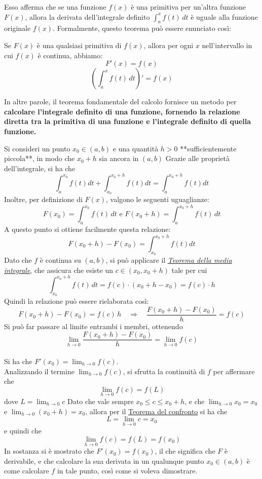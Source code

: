 \documentclass{article}
\begin{document}
Esso afferma che se una funzione $f(x)$ è una primitiva per un'altra funzione
$F(x)$, allora la derivata dell'integrale definito $\int_a^x f(t) \, dt$ è
uguale alla funzione originale $f(x)$. Formalmente, questo teorema può essere
enunciato così:

Se $F(x)$ è una qualsiasi primitiva di $f(x)$, allora per ogni $x$
nell'intervallo in cui $f(x)$ è continua, abbiamo: $$ F'(x) = f(x) $$ $$ \left(
    \int_a^x f(t) \, dt \right)' = f(x) $$

In altre parole, il teorema fondamentale del calcolo fornisce un metodo per
\textbf{calcolare l'integrale definito di una funzione, fornendo la relazione
    diretta tra la primitiva di una funzione e l'integrale definito di quella
    funzione.}

Si consideri un punto $x_0 \in (a,b)$ e una quantità $h > 0$ **sufficientemente
piccola**, in modo che $x_0 + h$ sia ancora in $(a,b)$ Grazie alle proprietà
dell'integrale, si ha che $$\int_a^{x_0} f(t)dt + \int_{x_0}^{x_0+h} f(t)dt =
    \int_a^{x_0+h}f(t)dt$$ Inoltre, per definizione di $F(x)$, valgono le seguenti
uguaglianze:$$F(x_0) = \int_a^{x_0} f(t) \, dt \text{ e } F(x_0 + h) =
    \int_a^{x_0+h}f(t) \, dt$$ A questo punto si ottiene facilmente questa
relazione: $$F(x_0+h) - F(x_0) = \int_{x_0}^{x_0 + h}f(t)dt$$ Dato che $f$ è
continua su $(a,b)$, si può applicare il \textit{\underline{Teorema della media
        integrale}}, che assicura che esiste un $c \in (x_0, x_0 + h)$ tale per cui
$$\int_{x_0}^{x_0 + h}f(t) \, dt = f(c) \cdot (x_0 +h - x_0) = f(c) \cdot
    h$$Quindi la relazione può essere rielaborata così: $$F(x_0+h) - F(x_0) = f(c)
    \, h \quad \Rightarrow \quad \frac{F(x_0+h) - F(x_0)}{h} = f(c)$$ Si può far
passare al limite entrambi i membri, ottenendo$$\lim_{h \to 0} \frac{F(x_0+h) -
        F(x_0)}{h} = \lim_{h \to 0}f(c)$$\\ Si ha che $F'(x_0) = \lim_{h \to
        0}f(c)$.\\Analizzando il termine $\lim_{h \to 0}f(c)$, si sfrutta la continuità
di $f$ per affermare che $$\lim_{h \to 0}f(c) = f(L)$$ dove $L = \lim_{h \to
        0}c$ Dato che vale sempre $x_0 \leq c \leq x_0 + h$, e che $\lim_{h \to 0}x_0 =
    x_0$ e $\lim_{h \to 0} ( x_0 + h )= x_0$, allora per il \underline{Teorema del
    confronto} si ha che \[L = \lim_{h \to 0}c = x_0\] e quindi che \[\lim_{h \to 0}f(c) = f(L) = f(x_0)\]
In sostanza si è mostrato che $F'(x_0) = f(x_0)$, il che significa che $F$ è
derivabile, e che calcolare la sua derivata in un qualunque punto $x_0 \in
    (a,b)$ è come calcolare $f$ in tale punto, così come si voleva dimostrare.
\end{document}
